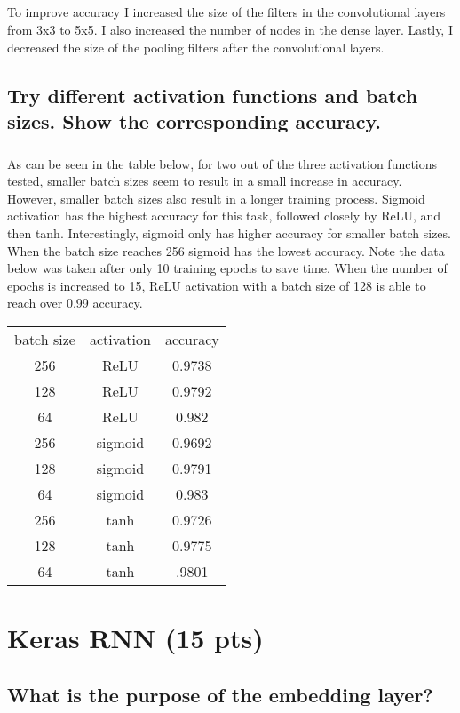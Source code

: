 \documentclass[11pt]{article}
\begin{document}
\subparagraph{}

To improve accuracy I increased the size of the filters in the convolutional layers from 3x3 to 5x5. I also increased the number of nodes in the dense layer. Lastly, I decreased the size of the pooling filters after the convolutional layers.

\subsection{Try different activation functions and batch sizes. Show the corresponding accuracy.}

\subparagraph{}

As can be seen in the table below, for two out of the three activation functions tested, smaller batch sizes seem to result in a small increase in accuracy. However, smaller batch sizes also result in a longer training process. Sigmoid activation has the highest accuracy for this task, followed closely by ReLU, and then tanh. Interestingly, sigmoid only has higher accuracy for smaller batch sizes. When the batch size reaches 256 sigmoid has the lowest accuracy. Note the data below was taken after only 10 training epochs to save time. When the number of epochs is increased to 15, ReLU activation with a batch size of 128 is able to reach over 0.99 accuracy. 

\begin{center}
\begin{tabular}{ |c|c|c| }
	\hline
	batch size & activation & accuracy \\
	256 & ReLU & 0.9738 \\
	128 & ReLU & 0.9792 \\
	64 & ReLU & 0.982 \\
	\hline
	256 & sigmoid & 0.9692 \\
	128 & sigmoid & 0.9791 \\
	64 & sigmoid & 0.983 \\
	\hline
	256 & tanh & 0.9726 \\
	128 & tanh & 0.9775 \\
	64 & tanh & .9801 \\
	\hline
\end{tabular}
\end{center}

\section{Keras RNN (15 pts)}

\subsection{What is the purpose of the embedding layer?}
\end{document}
